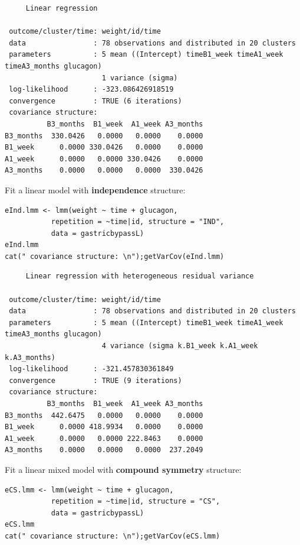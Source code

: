 \documentclass[12pt]{article}
\begin{document}
\begin{verbatim}
     Linear regression 

 outcome/cluster/time: weight/id/time 
 data                : 78 observations and distributed in 20 clusters 
 parameters          : 5 mean ((Intercept) timeB1_week timeA1_week timeA3_months glucagon) 
                       1 variance (sigma) 
 log-likelihood      : -323.086426918519 
 convergence         : TRUE (6 iterations)
 covariance structure: 
          B3_months  B1_week  A1_week A3_months
B3_months  330.0426   0.0000   0.0000    0.0000
B1_week      0.0000 330.0426   0.0000    0.0000
A1_week      0.0000   0.0000 330.0426    0.0000
A3_months    0.0000   0.0000   0.0000  330.0426
\end{verbatim}

Fit a linear model with \textbf{independence} structure:
\lstset{language=r,label= ,caption= ,captionpos=b,numbers=none}
\begin{lstlisting}
eInd.lmm <- lmm(weight ~ time + glucagon,
	       repetition = ~time|id, structure = "IND",
	       data = gastricbypassL)
eInd.lmm
cat(" covariance structure: \n");getVarCov(eInd.lmm)
\end{lstlisting}

\begin{verbatim}
     Linear regression with heterogeneous residual variance 

 outcome/cluster/time: weight/id/time 
 data                : 78 observations and distributed in 20 clusters 
 parameters          : 5 mean ((Intercept) timeB1_week timeA1_week timeA3_months glucagon) 
                       4 variance (sigma k.B1_week k.A1_week k.A3_months) 
 log-likelihood      : -321.457830361849 
 convergence         : TRUE (9 iterations)
 covariance structure: 
          B3_months  B1_week  A1_week A3_months
B3_months  442.6475   0.0000   0.0000    0.0000
B1_week      0.0000 418.9934   0.0000    0.0000
A1_week      0.0000   0.0000 222.8463    0.0000
A3_months    0.0000   0.0000   0.0000  237.2049
\end{verbatim}

\clearpage

Fit a linear mixed model with \textbf{compound symmetry} structure:
\lstset{language=r,label= ,caption= ,captionpos=b,numbers=none}
\begin{lstlisting}
eCS.lmm <- lmm(weight ~ time + glucagon,
	       repetition = ~time|id, structure = "CS",
	       data = gastricbypassL)
eCS.lmm
cat(" covariance structure: \n");getVarCov(eCS.lmm)
\end{lstlisting}
\end{document}
